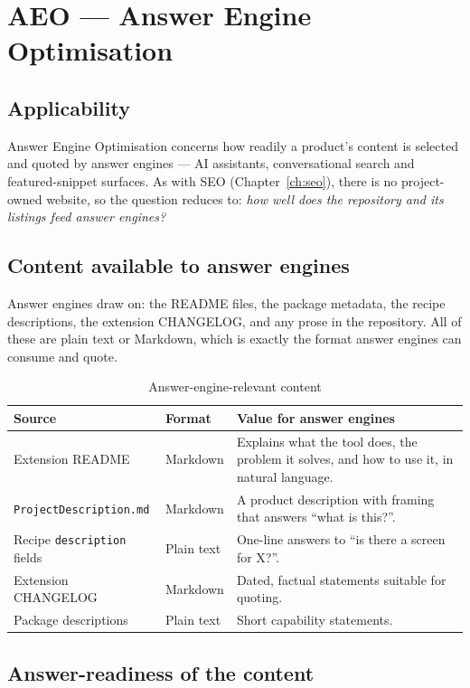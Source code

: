 \chapter{AEO --- Answer Engine Optimisation}
\label{ch:aeo}

\section{Applicability}

Answer Engine Optimisation concerns how readily a product's content is selected
and quoted by answer engines --- AI assistants, conversational search and
featured-snippet surfaces. As with SEO (Chapter~\ref{ch:seo}), there is no
project-owned website, so the question reduces to: \emph{how well does the
repository and its listings feed answer engines?}

\section{Content available to answer engines}

Answer engines draw on: the README files, the package metadata, the recipe
descriptions, the extension CHANGELOG, and any prose in the repository. All of
these are plain text or Markdown, which is exactly the format answer engines can
consume and quote.

\begin{longtable}{p{4.4cm}p{3.2cm}p{6.6cm}}
\caption{Answer-engine-relevant content}\\
\toprule
\textbf{Source} & \textbf{Format} & \textbf{Value for answer engines} \\
\midrule

Extension README & Markdown & Explains what the tool does, the problem it solves,
and how to use it, in natural language. \\
\texttt{ProjectDescription.md} & Markdown & A product description with framing that
answers ``what is this?''. \\
Recipe \texttt{description} fields & Plain text & One-line answers to ``is there a
screen for X?''. \\
Extension CHANGELOG & Markdown & Dated, factual statements suitable for quoting. \\
Package descriptions & Plain text & Short capability statements. \\
\bottomrule
\end{longtable}

\section{Answer-readiness of the content}


